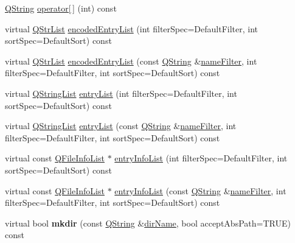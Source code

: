 \begin{DoxyCompactItemize}
\item 
\mbox{\hyperlink{class_q_string}{Q\+String}} \mbox{\hyperlink{class_q_dir_a1f76a6cf2cdc4e7d7c1421aac8b77b7f}{operator\mbox{[}$\,$\mbox{]}}} (int) const
\item 
virtual \mbox{\hyperlink{class_q_str_list}{Q\+Str\+List}} \mbox{\hyperlink{class_q_dir_a584e15a955a13bcabc9ec4b0330b7d5d}{encoded\+Entry\+List}} (int filter\+Spec=Default\+Filter, int sort\+Spec=Default\+Sort) const
\item 
virtual \mbox{\hyperlink{class_q_str_list}{Q\+Str\+List}} \mbox{\hyperlink{class_q_dir_a13b33b84ec9533c9649887a2577badd9}{encoded\+Entry\+List}} (const \mbox{\hyperlink{class_q_string}{Q\+String}} \&\mbox{\hyperlink{class_q_dir_a6d71d046861c1728359a6119a1250a74}{name\+Filter}}, int filter\+Spec=Default\+Filter, int sort\+Spec=Default\+Sort) const
\item 
virtual \mbox{\hyperlink{class_q_string_list}{Q\+String\+List}} \mbox{\hyperlink{class_q_dir_ab5e2b4ce772dc4b8941425cf780df9ab}{entry\+List}} (int filter\+Spec=Default\+Filter, int sort\+Spec=Default\+Sort) const
\item 
virtual \mbox{\hyperlink{class_q_string_list}{Q\+String\+List}} \mbox{\hyperlink{class_q_dir_aa575c8ea3470de67aaffc928f8a13a8c}{entry\+List}} (const \mbox{\hyperlink{class_q_string}{Q\+String}} \&\mbox{\hyperlink{class_q_dir_a6d71d046861c1728359a6119a1250a74}{name\+Filter}}, int filter\+Spec=Default\+Filter, int sort\+Spec=Default\+Sort) const
\item 
virtual const \mbox{\hyperlink{class_q_internal_list}{Q\+File\+Info\+List}} $\ast$ \mbox{\hyperlink{class_q_dir_ada9ea9da108cbebd0ac88231f39fced0}{entry\+Info\+List}} (int filter\+Spec=Default\+Filter, int sort\+Spec=Default\+Sort) const
\item 
virtual const \mbox{\hyperlink{class_q_internal_list}{Q\+File\+Info\+List}} $\ast$ \mbox{\hyperlink{class_q_dir_ab0a6216638ea6a4d2564a21a451d215e}{entry\+Info\+List}} (const \mbox{\hyperlink{class_q_string}{Q\+String}} \&\mbox{\hyperlink{class_q_dir_a6d71d046861c1728359a6119a1250a74}{name\+Filter}}, int filter\+Spec=Default\+Filter, int sort\+Spec=Default\+Sort) const
\item 
\mbox{\label{class_q_dir_a66da57810aab1ffe3455edb9abe1a974}} 
virtual bool {\bfseries mkdir} (const \mbox{\hyperlink{class_q_string}{Q\+String}} \&\mbox{\hyperlink{class_q_dir_a2c904d64a7194a57ee583d111cbbdeff}{dir\+Name}}, bool accept\+Abs\+Path=T\+R\+UE) const
\item 

\end{DoxyCompactItemize}
